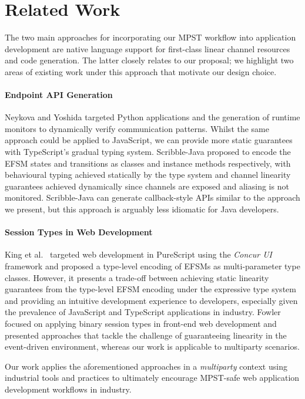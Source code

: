 \section{Related Work}
The two main approaches for incorporating our MPST workflow into application
development are native language support for first-class linear channel
resources \cite{ATS} and code generation.
The latter closely relates to our proposal;
we highlight two areas of existing work under this approach that motivate our
design choice.

\paragraph{Endpoint API Generation}
Neykova and Yoshida targeted Python applications and the generation of runtime
monitors \cite{Python2017} to dynamically verify communication patterns.
Whilst the same approach could be applied to JavaScript, we can provide more
static guarantees with TypeScript's gradual typing system.
Scribble-Java \cite{Hybrid2016} proposed to encode the EFSM
states and transitions as classes and instance methods respectively, with
behavioural typing achieved statically by the type system and channel linearity
guarantees achieved dynamically since channels are exposed and
aliasing is not monitored.
Scribble-Java can generate callback-style APIs similar to the approach we
present, but this approach is arguably less idiomatic for Java developers.

\paragraph{Session Types in Web Development}
King et al.\ \cite{PureScript2019} targeted web development in PureScript using the
\textit{Concur UI} framework and proposed a type-level encoding of EFSMs as
multi-parameter type classes.
However, it presents a trade-off between achieving static linearity guarantees
from the type-level EFSM encoding under the expressive type system and
providing an intuitive development experience to developers, especially given
the prevalence of JavaScript and TypeScript applications in industry.
Fowler \cite{MVU2019} focused on applying binary session types in front-end web
development and presented approaches that tackle the challenge of guaranteeing
linearity in the event-driven environment, whereas our work is applicable to
multiparty scenarios.

Our work applies the aforementioned approaches in a \textit{multiparty} context
using industrial tools and practices to ultimately encourage MPST-safe web
application development workflows in industry.


